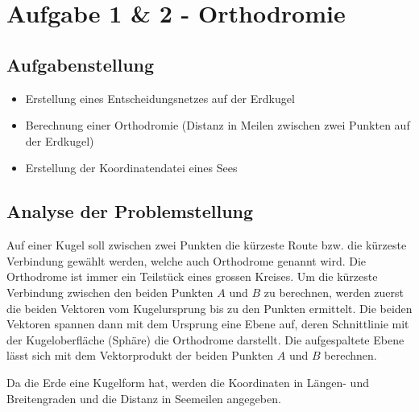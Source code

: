 \newcommand\DrawLatitudeCirclered[2][1]{
  \LatitudePlane{\angEl}{#2}
  \tikzset{current plane/.prefix style={scale=#1}}
  \pgfmathsetmacro\sinVis{sin(#2)/cos(#2)*sin(\angEl)/cos(\angEl)}
  \pgfmathsetmacro\angVis{asin(min(1,max(\sinVis,-1)))}
\draw[current plane,red,thick] (-50:1) arc (-50:-35:1);
}




\section{Aufgabe 1 \& 2 - Orthodromie}
\subsection{Aufgabenstellung}
\begin{itemize}
  \item Erstellung eines Entscheidungsnetzes auf der Erdkugel
  \item Berechnung einer Orthodromie (Distanz in Meilen zwischen zwei Punkten auf der Erdkugel)
  \item Erstellung der Koordinatendatei eines Sees
\end{itemize}

\subsection{Analyse der Problemstellung}
Auf einer Kugel soll zwischen zwei Punkten die kürzeste Route bzw. die kürzeste Verbindung gewählt werden, welche auch Orthodrome genannt wird. Die Orthodrome ist immer ein Teilstück eines grossen Kreises. Um die kürzeste Verbindung zwischen den beiden Punkten $A$ und $B$ zu berechnen, werden zuerst die beiden Vektoren vom Kugelursprung bis zu den Punkten ermittelt. Die beiden Vektoren spannen dann mit dem Ursprung eine Ebene auf, deren Schnittlinie mit der Kugeloberfläche (Sphäre) die Orthodrome darstellt.  Die aufgespaltete Ebene lässt sich mit dem Vektorprodukt der beiden Punkten $A$ und $B$  berechnen. 


Da die Erde eine Kugelform hat, werden die Koordinaten in Längen- und Breitengraden und die Distanz in Seemeilen angegeben. 

